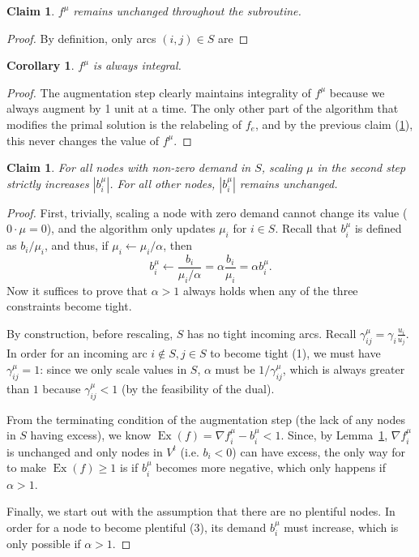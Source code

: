 \documentclass[12pt]{article}
\newtheorem{corollary}{Corollary}[theorem]
\newtheorem{claim}[theorem]{Claim}
\theoremstyle{definition}
\newcommand{\fu}{f^{\mu}}
\newcommand{\nfiu}{\nabla \fu_i}
\newcommand{\biu}{b_{i}^{\mu}}
\newcommand{\giij}{\gamma_{ij}^{\mu}}
\newcommand{\vsrc}{V^{t}}
\DeclareMathOperator{\Ex}{Ex}
\begin{document}
\begin{claim}
$f^{\mu}$ remains unchanged throughout the subroutine.
\label{lem:fsame}
\end{claim} 
\begin{proof}
By definition, only arcs $(i,j) \in S$ are 
\end{proof}
\begin{corollary}
$f^{\mu}$ is always integral.
\end{corollary}
\begin{proof}
The augmentation step clearly maintains integrality of $f^{\mu}$ because we
always augment by 1 unit at a time. The only other part of the algorithm that
modifies the primal solution is the relabeling of $f_e$, and by the previous
claim (\ref{lem:fsame}), this never changes the value of $f^{\mu}$.
\end{proof}
\begin{claim}
	For all nodes with non-zero demand in $S$, scaling $\mu$ in the second step
	strictly increases $|\biu|$. For all other nodes, $|\biu|$ remains unchanged.
\end{claim}
\begin{proof}
	First, trivially, scaling a node with zero demand cannot change its value
	($0\cdot\mu=0$), and the algorithm only updates $\mu_i$ for $i \in S$. Recall
	that $\biu$ is defined as $b_i / \mu_i$, and thus, if $\mu_i\leftarrow \mu_i / \alpha$,
	then
	\[ \biu \leftarrow \frac{b_i}{\mu_i / \alpha} = \alpha\frac{b_i}{\mu_i} = \alpha \biu. \] 
	Now it suffices to prove that $\alpha > 1$ always holds when any of the three
	constraints become tight.
	
	By construction, before rescaling, $S$ has no tight
	incoming arcs. Recall $\giij = \gamma_i\frac{u_i}{u_j}$. In order for an
	incoming arc $i \notin S, j\in S$ to become tight (1), we must have $\giij=1$:
	since we only scale values in $S$, $\alpha$ must be ${1}/{\giij}$, which is
	always greater than $1$ because $\giij < 1$ (by the feasibility of the dual).

	From the terminating condition of the augmentation step (the lack of any nodes
	in $S$ having excess), we know $\Ex(f) = \nfiu - \biu < 1$. Since, by
	Lemma~\ref{lem:fsame}, $\nfiu$ is unchanged and only nodes in $\vsrc$ (i.e. $b_i<0$)
	can have excess, the only way for to make $\Ex(f) \ge 1$ is if $\biu$ becomes
	more negative, which only happens if $\alpha > 1$. 
	
	Finally, we start out with the assumption that there are no plentiful nodes.
	In order for a node to become plentiful (3), its demand $\biu$ must increase,
	which is only possible if $\alpha > 1$.
\end{proof}
\end{document}

